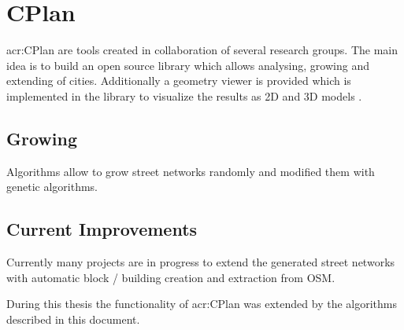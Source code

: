 \section{CPlan}
\label{CPlan}
\gls{acr:CPlan} are tools created in collaboration of several research groups. The main idea is to build an open source library which allows analysing, growing and extending of cities. Additionally a geometry viewer is provided which is implemented in the library to visualize the results as 2D and 3D models \citep{cPlan:2015}.

\subsection{Growing}
Algorithms allow to grow street networks randomly and modified them with genetic algorithms.

\subsection{Current Improvements}
Currently many projects are in progress to extend the generated street networks with automatic block / building creation and extraction from \gls{OSM}.

During this thesis the functionality of \gls{acr:CPlan} was extended by the algorithms described in this document.
